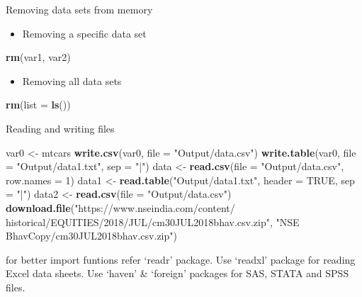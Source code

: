 \documentclass[ignorenonframetext,]{beamer}
\newenvironment{Shaded}{\begin{snugshade}}{\end{snugshade}}
\newcommand{\DataTypeTok}[1]{\textcolor[rgb]{0.13,0.29,0.53}{#1}}
\newcommand{\DecValTok}[1]{\textcolor[rgb]{0.00,0.00,0.81}{#1}}
\newcommand{\KeywordTok}[1]{\textcolor[rgb]{0.13,0.29,0.53}{\textbf{#1}}}
\newcommand{\NormalTok}[1]{#1}
\newcommand{\OtherTok}[1]{\textcolor[rgb]{0.56,0.35,0.01}{#1}}
\newcommand{\StringTok}[1]{\textcolor[rgb]{0.31,0.60,0.02}{#1}}
\providecommand{\tightlist}{%
  \setlength{\itemsep}{0pt}\setlength{\parskip}{0pt}}
\begin{document}
\begin{frame}[fragile]{Removing data sets from memory}
\protect\hypertarget{removing-data-sets-from-memory}{}

\begin{itemize}
\tightlist
\item
  Removing a specific data set
\end{itemize}

\begin{Shaded}
\begin{Highlighting}[]
\KeywordTok{rm}\NormalTok{(var1, var2)}
\end{Highlighting}
\end{Shaded}

\begin{itemize}
\tightlist
\item
  Removing all data sets
\end{itemize}

\begin{Shaded}
\begin{Highlighting}[]
\KeywordTok{rm}\NormalTok{(}\DataTypeTok{list =} \KeywordTok{ls}\NormalTok{())}
\end{Highlighting}
\end{Shaded}

\end{frame}

\begin{frame}[fragile]{Reading and writing files}
\protect\hypertarget{reading-and-writing-files}{}

\begin{Shaded}
\begin{Highlighting}[]
\NormalTok{var0 <-}\StringTok{ }\NormalTok{mtcars}
\KeywordTok{write.csv}\NormalTok{(var0, }\DataTypeTok{file =} \StringTok{"Output/data.csv"}\NormalTok{)}
\KeywordTok{write.table}\NormalTok{(var0, }\DataTypeTok{file =} \StringTok{"Output/data1.txt"}\NormalTok{, }\DataTypeTok{sep =} \StringTok{"|"}\NormalTok{)}
\NormalTok{data <-}\StringTok{ }\KeywordTok{read.csv}\NormalTok{(}\DataTypeTok{file =} \StringTok{"Output/data.csv"}\NormalTok{, }\DataTypeTok{row.names =} \DecValTok{1}\NormalTok{)}
\NormalTok{data1 <-}\StringTok{ }\KeywordTok{read.table}\NormalTok{(}\StringTok{"Output/data1.txt"}\NormalTok{, }
                    \DataTypeTok{header =} \OtherTok{TRUE}\NormalTok{, }\DataTypeTok{sep =} \StringTok{"|"}\NormalTok{)}
\NormalTok{data2 <-}\StringTok{ }\KeywordTok{read.csv}\NormalTok{(}\DataTypeTok{file =} \StringTok{"Output/data.csv"}\NormalTok{)}
\KeywordTok{download.file}\NormalTok{(}\StringTok{"https://www.nseindia.com/content/}
\StringTok{  historical/EQUITIES/2018/JUL/cm30JUL2018bhav.csv.zip"}\NormalTok{,}
  \StringTok{"NSE BhavCopy/cm30JUL2018bhav.csv.zip"}\NormalTok{)}
\end{Highlighting}
\end{Shaded}

for better import funtions refer `readr' package. Use `readxl' package
for reading Excel data sheets. Use `haven' \& `foreign' packages for
SAS, STATA and SPSS files.

\end{frame}
\end{document}
